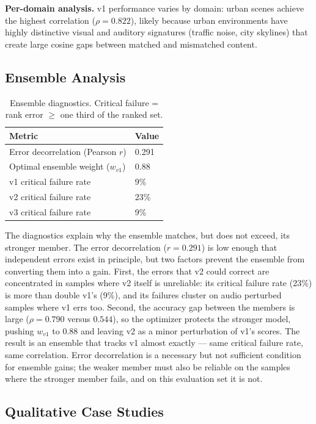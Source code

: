 \documentclass[a4paper,fleqn]{cas-sc}
\begin{document}
\begin{itemize}
\textbf{Per-domain analysis.} v1 performance varies by domain: urban scenes achieve the highest correlation ($\rho = 0.822$), likely because urban environments have highly distinctive visual and auditory signatures (traffic noise, city skylines) that create large cosine gaps between matched and mismatched content.

\subsection{Ensemble Analysis}\label{sec:ensemble-analysis}

\begin{table}[t]
\caption{Ensemble diagnostics. Critical failure = rank error $\geq$ one third of the ranked set.}\label{tab:ensemble-diag}
\centering
\begin{tabular}{ll}
\toprule
Metric & Value \\
\midrule
Error decorrelation (Pearson $r$) & 0.291 \\
Optimal ensemble weight ($w_{v1}$) & 0.88 \\
v1 critical failure rate & 9\% \\
v2 critical failure rate & 23\% \\
v3 critical failure rate & 9\% \\
\bottomrule
\end{tabular}
\end{table}

The diagnostics explain why the ensemble matches, but does not exceed, its stronger member. The error decorrelation ($r = 0.291$) is low enough that independent errors exist in principle, but two factors prevent the ensemble from converting them into a gain. First, the errors that v2 could correct are concentrated in samples where v2 itself is unreliable: its critical failure rate (23\%) is more than double v1's (9\%), and its failures cluster on audio perturbed samples where v1 errs too. Second, the accuracy gap between the members is large ($\rho = 0.790$ versus $0.544$), so the optimizer protects the stronger model, pushing $w_{v1}$ to 0.88 and leaving v2 as a minor perturbation of v1's scores. The result is an ensemble that tracks v1 almost exactly — same critical failure rate, same correlation. Error decorrelation is a necessary but not sufficient condition for ensemble gains; the weaker member must also be reliable on the samples where the stronger member fails, and on this evaluation set it is not.

\subsection{Qualitative Case Studies}\label{sec:case-studies}


\end{itemize}
\end{document}
